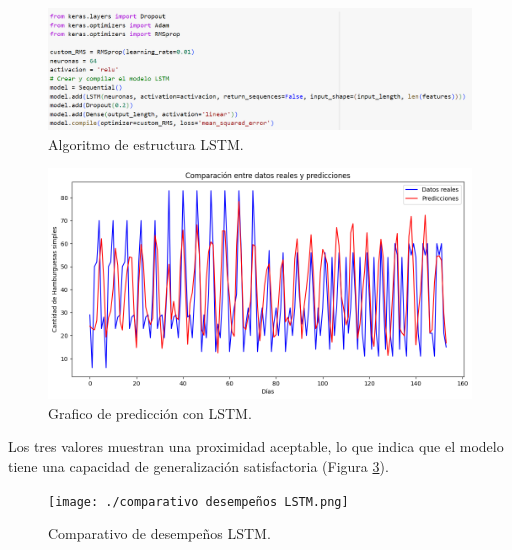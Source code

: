 \begin{figure}[H]
  \begin{center}
    \includegraphics[scale=0.40]{./LSTM estructura.png}
    \caption{Algoritmo de estructura LSTM.}
    \label{fig:codigo_lstm}
  \end{center}
\end{figure}


\begin{figure}[H]
  \begin{center}
    \includegraphics[scale=0.50]{./predicción 7 días.png}
    \caption{Grafico de predicción con LSTM.}
    \label{fig:grafico_lstm}
  \end{center}
\end{figure}

Los tres valores muestran una proximidad aceptable, lo que indica que el modelo
tiene una capacidad de generalización satisfactoria (Figura
\ref{fig:desenpeño}).
\begin{figure}[H]
  \begin{center}
    \texttt{[image: ./comparativo desempeños LSTM.png]}
    \caption{Comparativo de desempeños LSTM.}
    \label{fig:desenpeño}
  \end{center}
\end{figure}

